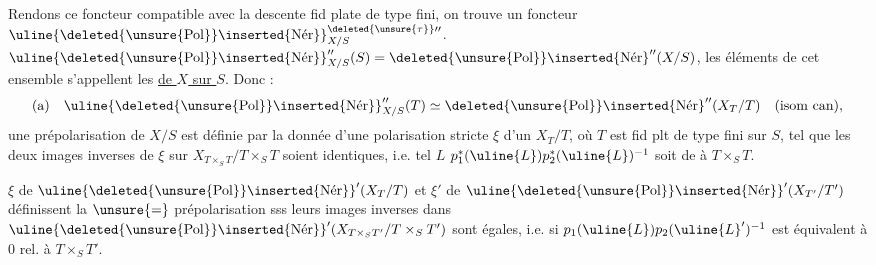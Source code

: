 Rendons ce foncteur compatible avec la descente fid plate de type fini, on trouve un foncteur $\uline{\deleted{\unsure{\operatorname{Pol}}}\inserted{\operatorname{N\acute{e}r}}}^{\deleted{\unsure{\tau}}\prime\prime}_{X/S}$.   $\uline{\deleted{\unsure{\operatorname{Pol}}}\inserted{\operatorname{N\acute{e}r}}}''_{X/S}(S)=\deleted{\unsure{\operatorname{Pol}}}\inserted{\operatorname{N\acute{e}r}}''(X/S)$, les éléments de cet ensemble s'appellent les  \uline{de $X$ sur $S$}. Donc :
\[
\text{(a)}\quad\uline{\deleted{\unsure{\operatorname{Pol}}}\inserted{\operatorname{N\acute{e}r}}}''_{X/S}(T)\simeq\deleted{\unsure{\operatorname{Pol}}}\inserted{\operatorname{N\acute{e}r}}''(X_T/T)\quad\text{(isom can)},
\]
une prépolarisation de $X/S$ est définie par la donnée d'une polarisation stricte $\xi$ d'un $X_T/T$, où $T$ est fid plt de type fini sur $S$, tel que les deux images inverses de $\xi$ sur $X_{T\times_S T}/T\times_S T$ soient identiques, i.e. tel $L$  $p_1^*(\uline{L})p_2^*(\uline{L})^{-1}$ soit de   à $T\times_S T$.

$\xi$ de $\uline{\deleted{\unsure{\operatorname{Pol}}}\inserted{\operatorname{N\acute{e}r}}}'(X_T/T)$ et $\xi'$ de $\uline{\deleted{\unsure{\operatorname{Pol}}}\inserted{\operatorname{N\acute{e}r}}}'(X_{T'}/T')$ définissent la $\unsure{=}$ prépolarisation sss leurs images inverses dans $\uline{\deleted{\unsure{\operatorname{Pol}}}\inserted{\operatorname{N\acute{e}r}}}'(X_{T\times_S T'}/T\times_S T')$ sont égales, i.e. si  $p_1(\uline{L})p_2(\uline{L}')^{-1}$ est  équivalent à $0$ rel. à $T\times_S T'$.

